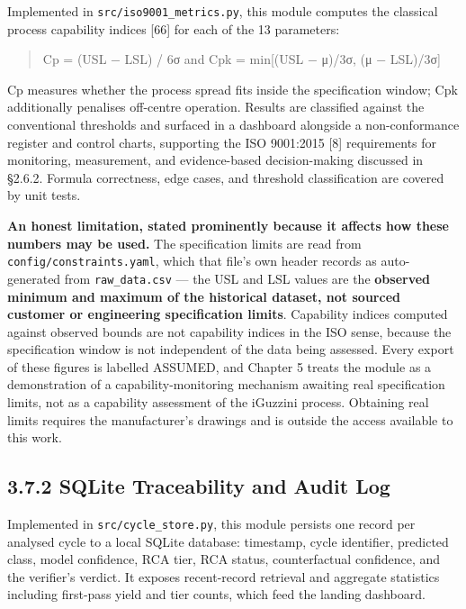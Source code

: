 Implemented in \texttt{src/iso9001\_metrics.py}, this module computes the classical process capability indices {[}66{]} for each of the 13 parameters:

\begin{quote}
Cp = (USL − LSL) / 6σ and Cpk = min{[}(USL − μ)/3σ, (μ − LSL)/3σ{]}
\end{quote}

Cp measures whether the process spread fits inside the specification window; Cpk additionally penalises off-centre operation. Results are classified against the conventional thresholds and surfaced in a dashboard alongside a non-conformance register and control charts, supporting the ISO 9001:2015 {[}8{]} requirements for monitoring, measurement, and evidence-based decision-making discussed in §2.6.2. Formula correctness, edge cases, and threshold classification are covered by unit tests.

\textbf{An honest limitation, stated prominently because it affects how these numbers may be used.} The specification limits are read from \texttt{config/constraints.yaml}, which that file's own header records as auto-generated from \texttt{raw\_data.csv} --- the USL and LSL values are the \textbf{observed minimum and maximum of the historical dataset, not sourced customer or engineering specification limits}. Capability indices computed against observed bounds are not capability indices in the ISO sense, because the specification window is not independent of the data being assessed. Every export of these figures is labelled ASSUMED, and Chapter 5 treats the module as a demonstration of a capability-monitoring mechanism awaiting real specification limits, not as a capability assessment of the iGuzzini process. Obtaining real limits requires the manufacturer's drawings and is outside the access available to this work.

\hypertarget{sqlite-traceability-and-audit-log}{%
\subsection{3.7.2 SQLite Traceability and Audit Log}\label{sqlite-traceability-and-audit-log}}

Implemented in \texttt{src/cycle\_store.py}, this module persists one record per analysed cycle to a local SQLite database: timestamp, cycle identifier, predicted class, model confidence, RCA tier, RCA status, counterfactual confidence, and the verifier's verdict. It exposes recent-record retrieval and aggregate statistics including first-pass yield and tier counts, which feed the landing dashboard.

